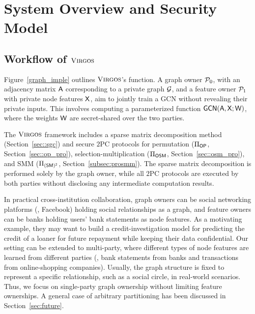 \section{System Overview and Security Model}
\label{sec::securitymodel}
\subsection{Workflow of \texorpdfstring{$\textnormal{\textsc{Virgos}}$}{\textcgnn}}
Figure~\ref{graph_imple} outlines $\textnormal{\textsc{Virgos}}$'s function.
A graph owner $\mathcal{P}_0$, 
with an adjacency matrix $\mathsf{A}$ corresponding to a private graph $\mathcal{G}$,
and a feature owner $\mathcal{P}_1$ with private node features $\mathsf{X}$, aim to jointly train a GCN without revealing their private inputs.
This involves computing a parameterized function $\mathsf{GCN}(\mathsf{A}, \mathsf{X}; \mathsf{W})$, where the weights $\mathsf{W}$ are secret-shared over the two parties.

The $\textnormal{\textsc{Virgos}}$ framework includes a sparse matrix decomposition method (Section~\ref{sec::sgc}) and secure $2$PC protocols for permutation ($\Pi_{\mathsf{OP}}$, Section~\ref{sec::op_pro}),
selection-multiplication ($\Pi_{\mathsf{OSM}}$, Section~\ref{sec::osm_pro}), and SMM ($\Pi_{\mathsf{(SM)^2}}$, Section~\ref{subsec:prosmm}).
The sparse matrix decomposition is performed solely by the graph owner, while all $2$PC protocols are executed by both parties without disclosing any intermediate computation results.

In practical cross-institution collaboration, graph owners can be social networking platforms (\eg, Facebook) holding social relationships as a graph, and feature owners can be banks holding users' bank statements as node features.
As a motivating example, they may want to build a credit-investigation model for predicting the credit of a loaner for future repayment
while keeping their data confidential.
Our setting can be extended to multi-party, where different types of node features are learned from different parties (\eg, bank statements from banks and transactions from online-shopping companies).
Usually, the graph structure is  fixed to represent a specific relationship, such as a social circle, in real-world scenarios.
Thus, we focus on single-party graph ownership without limiting feature ownerships.
A general case of arbitrary partitioning has been discussed in Section~\ref{sec:future}.
 
